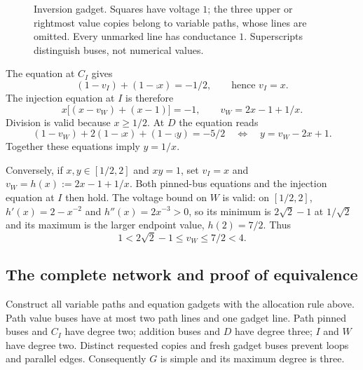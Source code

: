 \begin{figure}[htbp]
\centering
{}
\caption{Inversion gadget. Squares have voltage $1$; the three upper or
rightmost value copies belong to variable paths, whose lines are omitted.
Every unmarked line has conductance $1$. Superscripts distinguish buses,
not numerical values.}
\label{fig:inversion}
\end{figure}

The equation at $C_I$ gives
\[
 (1-v_I)+(1-\comp{x})=-1/2,
 \qquad\text{hence }v_I=x.
\]
The injection equation at $I$ is therefore
\begin{equation}
 x\bigl[(x-v_W)+(x-1)\bigr]=-1,
 \qquad v_W=2x-1+1/x.
 \label{eq:inversion-I}
\end{equation}
Division is valid because $x\ge1/2$. At $D$ the equation reads
\begin{equation}
 (1-v_W)+2(1-\comp{x})+(1-\comp{y})=-5/2
 \quad\Longleftrightarrow\quad y=v_W-2x+1.
 \label{eq:inversion-D}
\end{equation}
Together these equations imply $y=1/x$.

Conversely, if $x,y\in[1/2,2]$ and $xy=1$, set $v_I=x$ and
$v_W=h(x):=2x-1+1/x$. Both pinned-bus equations and the injection equation
at $I$ then hold. The voltage bound on $W$ is valid: on $[1/2,2]$,
$h'(x)=2-x^{-2}$ and $h''(x)=2x^{-3}>0$, so its minimum is
$2\sqrt{2}-1$ at $1/\sqrt{2}$ and its maximum is the larger endpoint value,
$h(2)=7/2$. Thus
\begin{equation}
 1<2\sqrt{2}-1\le v_W\le7/2<4.
 \label{eq:W-range}
\end{equation}

\subsection{The complete network and proof of equivalence}

Construct all variable paths and equation gadgets with the allocation rule
above. Path value buses have at most two path lines and one gadget line.
Path pinned buses and $C_I$ have degree two; addition buses and $D$ have
degree three; $I$ and $W$ have degree two. Distinct requested copies and fresh
gadget buses prevent loops and parallel edges. Consequently $G$ is simple and
its maximum degree is three.

